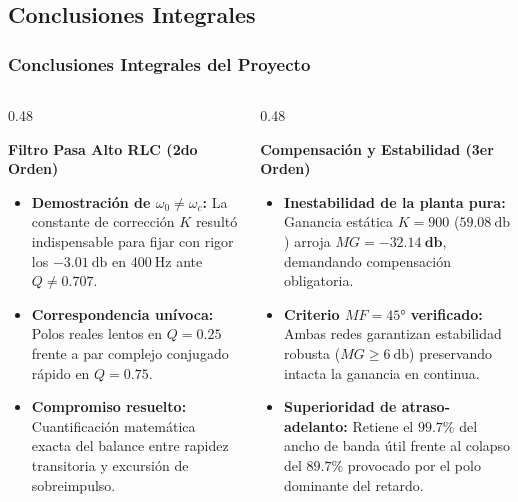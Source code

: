 \subsection{Conclusiones Integrales}
\begin{frame}
  \frametitle{Conclusiones Integrales del Proyecto}

  \begin{columns}[t, onlytextwidth]
    \begin{column}{0.48\textwidth}
      \begin{tarjeta}[top=4pt, bottom=4pt]
        {\fontsize{8.5pt}{10pt}\selectfont \textbf{\color{NavyDark} Filtro Pasa Alto RLC (2do Orden)}}\\[2pt]
        {\fontsize{7.2pt}{8.8pt}\selectfont
        \begin{itemize}\setlength{\itemsep}{1.5pt}
          \item \textbf{Demostración de $\omega_0 \neq \omega_c$:} La constante de corrección $K$ resultó indispensable para fijar con rigor los $\qty{-3.01}{\decibel}$ en $\qty{400}{\hertz}$ ante $Q \neq 0.707$.
          \item \textbf{Correspondencia unívoca:} Polos reales lentos en $Q = 0.25$ frente a par complejo conjugado rápido en $Q = 0.75$.
          \item \textbf{Compromiso resuelto:} Cuantificación matemática exacta del balance entre rapidez transitoria y excursión de sobreimpulso.
        \end{itemize}
        }
      \end{tarjeta}
    \end{column}

    \begin{column}{0.48\textwidth}
      \begin{tarjeta}[colframe=BlueAccent, top=4pt, bottom=4pt]
        {\fontsize{8.5pt}{10pt}\selectfont \textbf{\color{BlueAccent} Compensación y Estabilidad (3er Orden)}}\\[2pt]
        {\fontsize{7.2pt}{8.8pt}\selectfont
        \begin{itemize}\setlength{\itemsep}{1.5pt}
          \item \textbf{Inestabilidad de la planta pura:} Ganancia estática $K = 900$ ($\qty{59.08}{\decibel}$) arroja $MG = \mathbf{-32.14\ \unit{\decibel}}$, demandando compensación obligatoria.
          \item \textbf{Criterio $MF = \ang{45}$ verificado:} Ambas redes garantizan estabilidad robusta ($MG \ge \qty{6}{\decibel}$) preservando intacta la ganancia en continua.
          \item \textbf{Superioridad de atraso-adelanto:} Retiene el $\mathbf{99.7\%}$ del ancho de banda útil frente al colapso del $\mathbf{89.7\%}$ provocado por el polo dominante del retardo.
        \end{itemize}
        }
      \end{tarjeta}
    \end{column}
  \end{columns}
\end{frame}

